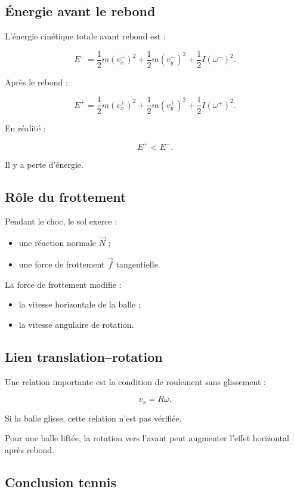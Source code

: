 \documentclass[11pt,a4paper]{article}
\begin{document}
\subsection{Énergie avant le rebond}

L'énergie cinétique totale avant rebond est :

\[
E^-=\frac12m(v_x^-)^2+\frac12m(v_y^-)^2+\frac12I(\omega^-)^2.
\]

Après le rebond :

\[
E^+=\frac12m(v_x^+)^2+\frac12m(v_y^+)^2+\frac12I(\omega^+)^2.
\]

En réalité :

\[
E^+<E^-.
\]

Il y a perte d'énergie.

\subsection{Rôle du frottement}

Pendant le choc, le sol exerce :
\begin{itemize}
    \item une réaction normale $\vec{N}$ ;
    \item une force de frottement $\vec{f}$ tangentielle.
\end{itemize}

La force de frottement modifie :
\begin{itemize}
    \item la vitesse horizontale de la balle ;
    \item la vitesse angulaire de rotation.
\end{itemize}

\subsection{Lien translation--rotation}

Une relation importante est la condition de roulement sans glissement :

\[
v_x=R\omega.
\]

Si la balle glisse, cette relation n'est pas vérifiée.

Pour une balle liftée, la rotation vers l'avant peut augmenter l'effet horizontal après rebond.

\subsection{Conclusion tennis}
\end{document}

